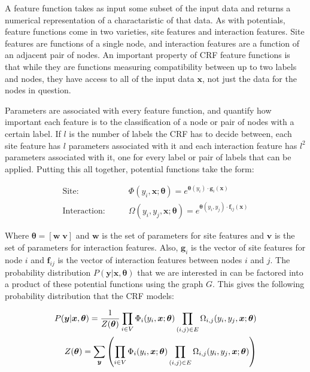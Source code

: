 \documentclass[10pt]{acmsiggraph}               %
\newcommand{\bm}[1]{\boldsymbol{#1}}
\begin{document}
A feature function takes as input some subset of the input data and
returns a numerical representation of a charactaristic of that
data. As with potentials, feature functions come in two varieties,
site features and interaction features. Site features are functions of
a single node, and interaction features are a function of an adjacent
pair of nodes.  An important property of CRF feature functions is that
while they are functions measuring compatibility between up to two
labels and nodes, they have access to all of the input data $\bm{x}$,
not just the data for the nodes in question.

Parameters are associated with every feature function, and quantify
how important each feature is to the classification of a node or pair
of nodes with a certain label.  If $l$ is the number of labels the CRF
has to decide between, each site feature has $l$ parameters associated
with it and each interaction feature has $l^2$ parameters associated
with it, one for every label or pair of labels that can be applied.
Putting this all together, potential functions take the form:

\begin{align*}
\textrm{Site:} &\qquad \Phi(y_i, \bm{x}; \bm{\theta}) = e^{\bm{\theta}(y_i) \cdot \bm{g}_i(\bm{x})} \\
\textrm{Interaction:}& \qquad \Omega(y_i, y_j, \bm{x}; \bm{\theta}) = e^{\bm{\theta}(y_i,y_j) \cdot \bm{f}_{i j}(\bm{x})}
\end{align*}

Where $\bm{\theta} = [ \bm{w \; v} ]$ and $\bm{w}$ is the set of
parameters for site features and $\bm{v}$ is the set of parameters for
interaction features.  Also, $\bm{g}_i$ is the vector of site features
for node $i$ and $\bm{f}_{i j}$ is the vector of interaction features
between nodes $i$ and $j$.  The probability distribution
$P(\bm{y}|\bm{x},\bm{\theta})$ that we are interested in can be
factored into a product of these potential functions using the graph
$G$.  This gives the following probability distribution that the CRF
models:

\begin{align*}
P(\bm{y}|\bm{x},\bm{\theta}) = {1 \over Z(\bm{\theta})} \prod_{i \in V} \Phi_i (y_i,\bm{x};\bm{\theta}) \prod_{(i,j) \in E} \Omega_{i,j} (y_i,y_j,\bm{x};\bm{\theta})\\
Z(\bm{\theta}) = \sum_{\bm{y}} \left( \prod_{i\in V} \Phi_i (y_i,\bm{x};\bm{\theta}) \prod_{(i,j) \in E} \Omega_{i,j} (y_i,y_j,\bm{x};\bm{\theta})\right)
\end{align*}
\end{document}
